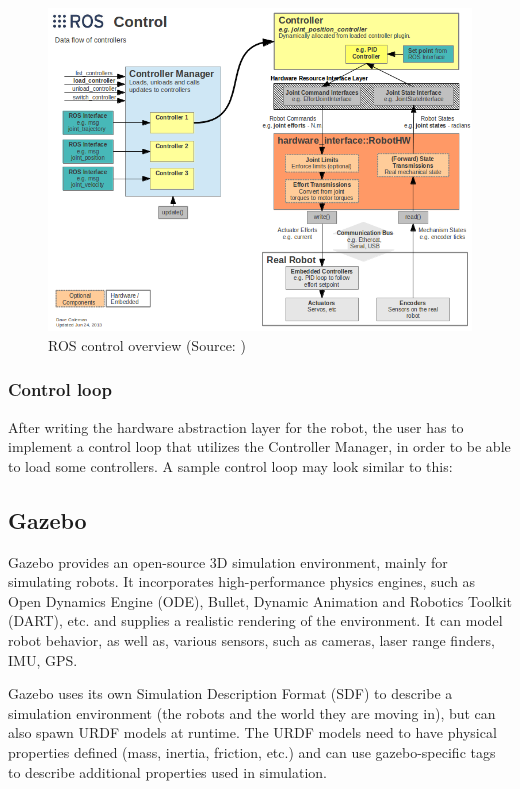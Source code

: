 \documentclass[english,inz,shortabstract]{iithesis}
\begin{document}
	
	\begin{figure}[ht]
		\centering
		\includegraphics[width=\textwidth]{img/ros_control.png}
		\caption{ROS control overview (Source: \cite{ros_control:wiki})}
		\label{fig:ros_control}
	\end{figure}

	\subsubsection{Control loop}
	After writing the hardware abstraction layer for the robot, the user has to implement a control loop that utilizes the Controller Manager, in order to be able to load some controllers. A sample control loop may look similar to this:

	

\pagebreak

	\subsection{Gazebo}
	Gazebo provides an open-source 3D simulation environment, mainly for simulating robots. It incorporates high-performance physics engines, such as Open Dynamics Engine (ODE), Bullet, Dynamic Animation and Robotics Toolkit (DART), etc. and supplies a realistic rendering of the environment. It can model robot behavior, as well as, various sensors, such as cameras, laser range finders, IMU, GPS.

	Gazebo uses its own Simulation Description Format (SDF) to describe a simulation environment (the robots and the world they are moving in), but can also spawn URDF models at runtime. The URDF models need to have physical properties defined (mass, inertia, friction, etc.) and can use gazebo-specific tags to describe additional properties used in simulation.
\end{document}
